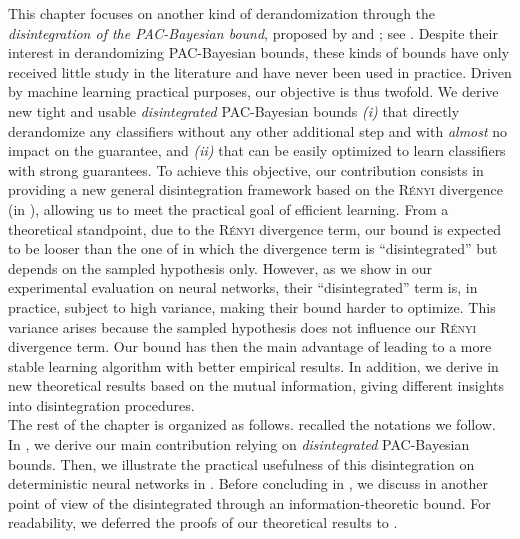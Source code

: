 This chapter focuses on another kind of derandomization
through the {\it disintegration of the PAC-Bayesian bound}, proposed by \citet[Th.1.2.7]{Catoni2007} and \citet{BlanchardFleuret2007}; see .
Despite their interest in derandomizing PAC-Bayesian bounds, these kinds of bounds have only received little study in the literature and have never been used in practice.
Driven by machine learning practical purposes, our objective is thus twofold.
We derive new tight and usable {\it disintegrated} PAC-Bayesian bounds {\it (i)} that directly derandomize any classifiers without any other additional step and with {\it almost} no impact on the guarantee,  and {\it (ii)} that can be easily optimized to learn classifiers with strong guarantees.
To achieve this objective, our contribution consists in providing a new general disintegration framework based on the \textsc{Rényi} divergence (in ), allowing us to meet the practical goal of efficient learning. 
From a theoretical standpoint, due to the \textsc{Rényi} divergence term, our bound is expected to be looser than the one of \citet[Th.1{\it(i)}]{RivasplataKuzborskijSzepesvariShaweTaylor2020} in which the divergence term is ``disintegrated'' but depends on the sampled hypothesis only.
However, as we show in our experimental evaluation on neural networks, their ``disintegrated'' term is, in practice, subject to high variance, making their bound harder to optimize. 
This variance arises because the sampled hypothesis does not influence our \textsc{Rényi} divergence term.
Our bound has then the main advantage of leading to a more stable learning algorithm  with better empirical results.
In addition, we derive in  new theoretical results based on the mutual information, giving different insights into disintegration procedures.\\

The rest of the chapter is organized as follows.
 recalled the notations we follow.
In , we derive our main contribution relying on {\it disintegrated} PAC-Bayesian bounds.
Then, we illustrate the practical usefulness of this disintegration on deterministic neural networks in .
Before concluding in , we discuss in  another point of view of the disintegrated through an information-theoretic bound.
For readability, we deferred the proofs of our theoretical results to .

